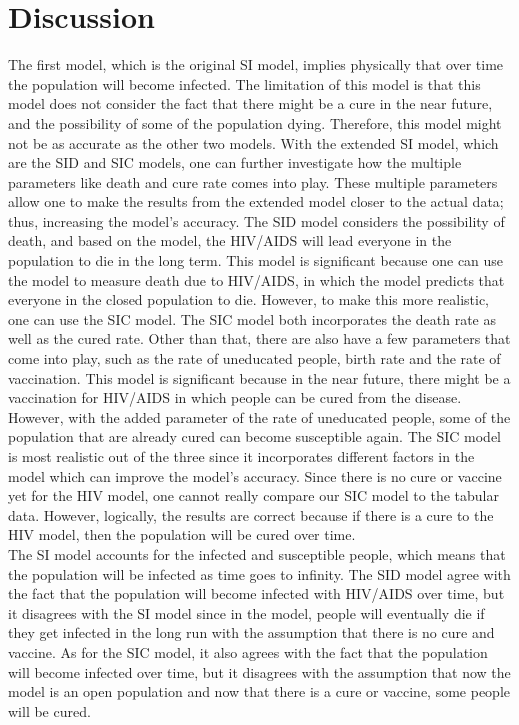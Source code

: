 \documentclass[a4paper, final, 12pt]{article}
\numberwithin{equation}{section}
\begin{document}
\section{Discussion}\label{sec:theory}
\hspace{22pt} The first model, which is the original SI model, implies physically that over time the population will become infected. The limitation of this model is that this model does not consider the fact that there might be a cure in the near future, and the possibility of some of the population dying. Therefore, this model might not be as accurate as the other two models. With the extended SI model, which are the SID and SIC models, one can further investigate how the multiple parameters like death and cure rate comes into play. These multiple parameters allow one to make the results from the extended model closer to the actual data; thus, increasing the model’s accuracy. The SID model considers the possibility of death, and based on the model, the HIV/AIDS will lead everyone in the population to die in the long term. This model is significant because one can use the model to measure death due to HIV/AIDS, in which the model predicts that everyone in the closed population to die. However, to make this more realistic, one can use the SIC model. The SIC model both incorporates the death rate as well as the cured rate. Other than that, there are also have a few parameters that come into play, such as the rate of uneducated people, birth rate and the rate of vaccination. This model is significant because in the near future, there might be a vaccination for HIV/AIDS in which people can be cured from the disease. However, with the added parameter of the rate of uneducated people, some of the population that are already cured can become susceptible again. The SIC model is most realistic out of the three since it incorporates different factors in the model which can improve the model’s accuracy. Since there is no cure or vaccine yet for the HIV model, one cannot really compare our SIC model to the tabular data. However, logically, the results are correct because if there is a cure to the HIV model, then the population will be cured over time. \\

The SI model accounts for the infected and susceptible people, which means that the population will be infected as time goes to infinity. The SID model agree with the fact that the population will become infected with HIV/AIDS over time, but it disagrees with the SI model since in the model, people will eventually die if they get infected in the long run with the assumption that there is no cure and vaccine. As for the SIC model, it also agrees with the fact that the population will become infected over time, but it disagrees with the assumption that now the model is an open population and now that there is a cure or vaccine, some people will be cured.\\
\end{document}
